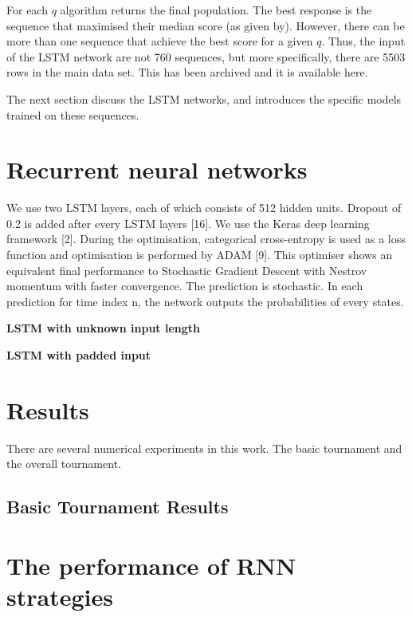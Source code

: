 \documentclass{article}
\begin{document}
For each \(q\) algorithm returns the final population. The best response
is the sequence that maximised their median score (as given by). However,
there  can be more than one sequence that achieve the best score for a given \(q\).
Thus, the input of the LSTM network are not 760 sequences, but more specifically,
there are 5503 rows in the main data set. This has been archived and it
is available here.

The next section discuss the LSTM networks, and introduces the specific
models trained on these sequences.

\section{Recurrent neural networks}\label{section:recurrent_neural_network}

We use two LSTM layers, each of which consists of 512 hidden units. Dropout of
0.2 is added after every LSTM layers [16]. We use the Keras deep learning
framework [2]. During the optimisation, categorical cross-entropy is used as a
loss function and optimisation is performed by ADAM [9]. This optimiser shows an
equivalent final performance to Stochastic Gradient Descent with Nestrov
momentum with faster convergence. The prediction is stochastic. In each
prediction for time index n, the network outputs the probabilities of every
states.

\textbf{LSTM with unknown input length}

\textbf{LSTM with padded input}


\section{Results}\label{section:results}

There are several numerical experiments in this work. The basic tournament
and the overall tournament.

\subsection{Basic Tournament Results}

\section{The performance of RNN strategies}



\end{document}
